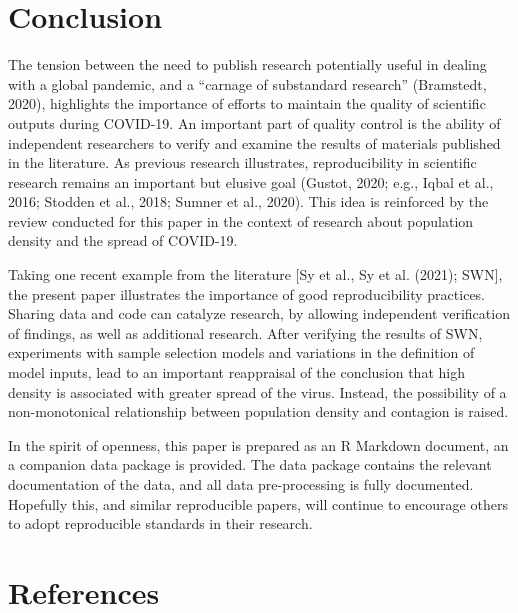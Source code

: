 \documentclass[]{elsarticle} %
\begin{document}
\hypertarget{conclusion}{%
\section{Conclusion}\label{conclusion}}

The tension between the need to publish research potentially useful in
dealing with a global pandemic, and a ``carnage of substandard
research'' (Bramstedt, 2020), highlights the importance of efforts to
maintain the quality of scientific outputs during COVID-19. An important
part of quality control is the ability of independent researchers to
verify and examine the results of materials published in the literature.
As previous research illustrates, reproducibility in scientific research
remains an important but elusive goal (Gustot, 2020; e.g., Iqbal et al.,
2016; Stodden et al., 2018; Sumner et al., 2020). This idea is
reinforced by the review conducted for this paper in the context of
research about population density and the spread of COVID-19.

Taking one recent example from the literature {[}Sy et al., Sy et al.
(2021); SWN{]}, the present paper illustrates the importance of good
reproducibility practices. Sharing data and code can catalyze research,
by allowing independent verification of findings, as well as additional
research. After verifying the results of SWN, experiments with sample
selection models and variations in the definition of model inputs, lead
to an important reappraisal of the conclusion that high density is
associated with greater spread of the virus. Instead, the possibility of
a non-monotonical relationship between population density and contagion
is raised.

In the spirit of openness, this paper is prepared as an R Markdown
document, an a companion data package is provided. The data package
contains the relevant documentation of the data, and all data
pre-processing is fully documented. Hopefully this, and similar
reproducible papers, will continue to encourage others to adopt
reproducible standards in their research.

\hypertarget{references}{%
\section*{References}\label{references}}
\end{document}
